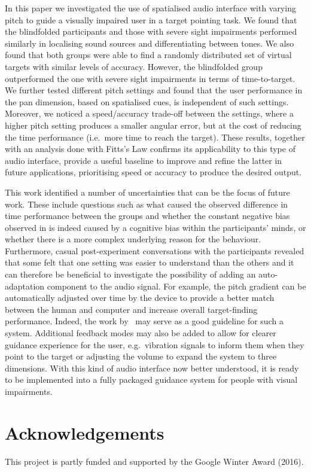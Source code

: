 \documentclass[]{interact}
\begin{document}
In this paper we investigated the use of spatialised audio interface with varying pitch to guide a visually impaired user in a target pointing task.
We found that the blindfolded participants and those with severe sight impairments performed similarly in localising sound sources and differentiating between tones. 
We also found that both groups were able to find a randomly distributed set of virtual targets with similar levels of accuracy.
However, the blindfolded group outperformed the one with severe sight impairments in terms of time-to-target. 
We further tested different pitch settings and found that the user performance in the pan dimension, based on spatialised cues, is independent of such settings.
Moreover, we noticed a speed/accuracy trade-off between the settings, where a higher pitch setting produces a smaller angular error, but at the cost of reducing the time performance (i.e.\ more time to reach the target). 
These results, together with an analysis done with Fitts's Law confirms its applicability to this type of audio interface, provide a useful baseline to improve and refine the latter in future applications, prioritising speed or accuracy to produce the desired output.

This work identified a number of uncertainties that can be the focus of future work.
These include questions such as what caused the observed difference in time performance between the groups and whether the constant negative bias observed in  is indeed caused by a cognitive bias within the participants' minds, or whether there is a more complex underlying reason for the behaviour.
Furthermore, casual post-experiment conversations with the participants revealed that some felt that one setting was easier to understand than the others and it can therefore be beneficial to investigate the possibility of adding an auto-adaptation component to the audio signal.
For example, the pitch gradient can be automatically adjusted over time by the device to provide a better match between the human and computer and increase overall target-finding performance.
Indeed, the work by~\cite{gallina2015progressive} may serve as a good guideline for such a system.
Additional feedback modes may also be added to allow for clearer guidance experience for the user, e.g.\ vibration signals to inform them when they point to the target or adjusting the volume to expand the system to three dimensions.
With this kind of audio interface now better understood, it is ready to be implemented into a fully packaged guidance system for people with visual impairments.

\section*{Acknowledgements}

This project is partly funded and supported by the Google Winter Award (2016).



\end{document}
